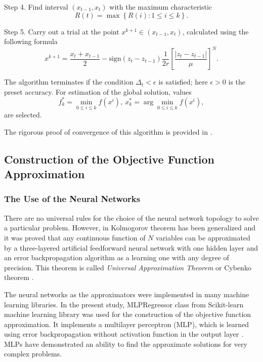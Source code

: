 \documentclass[sensors,article,submit,moreauthors,pdftex]{Definitions/mdpi}
\begin{document}
Step 4. Find interval $(x_{t-1},x_t)$ with the maximum characteristic
\begin{equation}\label{MaxR}
R(t)=\max{\left\{R(i): 1 \leq i \leq k \right\}}.
\end{equation}

Step 5. Carry out a trial at the point $x^{k+1}\in(x_{t-1},x_t)$, calculated using the following formula
\begin{equation}\label{NewX}
x^{k+1} = \frac{x_t+x_{t-1}}{2} - \mathrm{sign}(z_t-z_{t-1})\frac{1}{2r}\left[\frac{\left|z_t-z_{t-1}\right|}{\mu}\right]^N.
\end{equation}

The algorithm terminates if the condition $\Delta_t<\epsilon$ is satisfied; here $\epsilon>0$ is the preset accuracy. For estimation of the global solution, values
\[
f_k^\ast=\min_{0\leq i \leq k}f(x^i), \ x_k^\ast=\arg \min_{0\leq i \leq k}f(x^i),
\]
are selected.

The rigorous proof of convergence of this algorithm is provided in \cite{Strongin2000}. 



\subsection{Construction of the Objective Function Approximation}

\subsubsection{The Use of the Neural Networks}

There are no universal rules for the choice of the neural network topology to solve a particular problem. However, in \cite{Cybenko1989} Kolmogorov theorem has been generalized and it was proved that any continuous function of $N$ variables can be approximated by a three-layered artificial feedforward neural network with one hidden layer and an error backpropagation algorithm as a learning one with any degree of precision. This theorem is called \textit{Universal Approximation Theorem} or Cybenko theorem \cite{Hassoun1995}.

The neural networks as the approximators were implemented in many machine learning libraries.
In the present study, MLPRegressor class from Scikit-learn machine learning library was used for the construction of the objective function approximation. It implements a multilayer perceptron (MLP), which is learned using error backpropagation without activation function in the output layer \cite{Nielsen1989}. MLPs have demonstrated an ability to find the approximate solutions for very complex problems.
\end{document}
